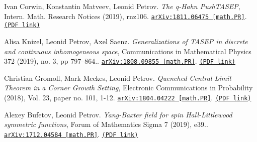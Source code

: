 \begin{etaremune}
\item 
Ivan Corwin, Konstantin Matveev, Leonid Petrov.
\emph{The q-Hahn PushTASEP}, Intern. Math. Research Notices (2019),  rnz106. 
\href{https://arxiv.org/abs/1811.06475}{\texttt{arXiv:1811.06475 [math.PR]}}. \href{https://storage.lpetrov.cc/research_files/Petrov-publ/30-publ-petrov-uva.pdf}{\texttt{(PDF link)}}





\item 
Alisa Knizel, Leonid Petrov, Axel Saenz.
\emph{Generalizations of TASEP in discrete and continuous inhomogeneous space}, Communications in Mathematical Physics 372 (2019), no. 3, pp 797–864.. 
\href{https://arxiv.org/abs/1808.09855}{\texttt{arXiv:1808.09855 [math.PR]}}. \href{https://storage.lpetrov.cc/research_files/Petrov-publ/29-publ-petrov-uva.pdf}{\texttt{(PDF link)}}











\item 
Christian Gromoll, Mark Meckes, Leonid Petrov.
\emph{Quenched Central Limit Theorem in a Corner Growth Setting}, Electronic Communications in Probability (2018), Vol. 23, paper no. 101, 1-12. 
\href{https://arxiv.org/abs/1804.04222}{\texttt{arXiv:1804.04222 [math.PR]}}. \href{https://storage.lpetrov.cc/research_files/Petrov-publ/28-publ-petrov-uva.pdf}{\texttt{(PDF link)}}













\item 
Alexey Bufetov, Leonid Petrov.
\emph{Yang-Baxter field for spin Hall-Littlewood symmetric functions}, Forum of Mathematics Sigma 7 (2019), e39.. 
\href{https://arxiv.org/abs/1712.04584}{\texttt{arXiv:1712.04584 [math.PR]}}. \href{https://storage.lpetrov.cc/research_files/Petrov-publ/27-publ-petrov-uva.pdf}{\texttt{(PDF link)}}














\end{etaremune}
